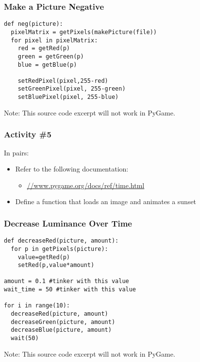 \begin{frame}[fragile]
	\frametitle{Make a Picture Negative}
	
\begin{lstlisting}
def neg(picture):
  pixelMatrix = getPixels(makePicture(file))
  for pixel in pixelMatrix:
    red = getRed(p)
    green = getGreen(p)
    blue = getBlue(p)
        
    setRedPixel(pixel,255-red)
    setGreenPixel(pixel, 255-green)
    setBluePixel(pixel, 255-blue)
\end{lstlisting}

Note: This source code excerpt will not work in PyGame.

\end{frame}

\begin{frame}
	\frametitle{Activity \#5}
	
	In pairs:
	
	\vspace{2em}
	
	\begin{itemize}
		\item Refer to the following documentation:
		\begin{itemize}
			\item \url{//www.pygame.org/docs/ref/time.html}
		\end{itemize}
		\item Define a function that loads an image and animates a sunset
	\end{itemize}
\end{frame}

\begin{frame}[fragile]
	\frametitle{Decrease Luminance Over Time}

\begin{lstlisting}
def decreaseRed(picture, amount):
  for p in getPixels(picture):
    value=getRed(p)
    setRed(p,value*amount)

amount = 0.1 #tinker with this value
wait_time = 50 #tinker with this value    
    
for i in range(10):
  decreaseRed(picture, amount)
  decreaseGreen(picture, amount)
  decreaseBlue(picture, amount)
  wait(50)
\end{lstlisting}

Note: This source code excerpt will not work in PyGame.

\end{frame}

